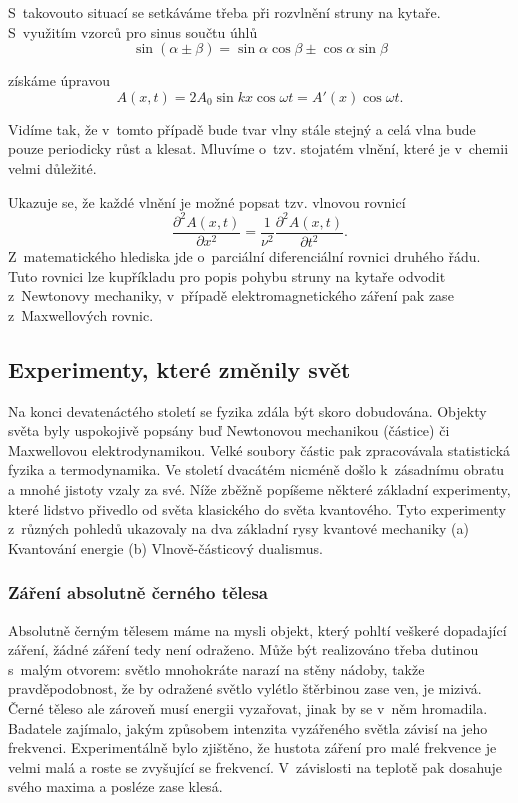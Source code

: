 \noindent S~takovouto situací se setkáváme třeba při rozvlnění struny na kytaře. S~využitím vzorců pro sinus součtu úhlů
\begin{equation}
\sin(\alpha \pm \beta) = \sin \alpha\cos\beta \pm \cos\alpha\sin\beta
\label{rov:Vlna7}
\end{equation}

\noindent získáme úpravou
\begin{equation}
A(x,t)=2A_0\sin kx \cos \omega t = A'(x)\cos \omega t.
\label{rov:Vlna8}
\end{equation}

\noindent Vidíme tak, že v~tomto případě bude tvar vlny stále stejný a celá vlna bude pouze periodicky růst a klesat. Mluvíme o~tzv. stojatém vlnění, které je v~chemii velmi důležité.

Ukazuje se, že každé vlnění je možné popsat tzv. vlnovou rovnicí
\begin{equation}
\frac{\partial ^2A(x,t)}{\partial x^2} = \frac{1}{\nu^2}\frac{\partial^2A(x,t)}{\partial t^2}\mbox{.}
\label{rov:Vlna9}
\end{equation}
Z~matematického hlediska jde o~parciální diferenciální rovnici druhého řádu. Tuto rovnici lze kupříkladu pro popis pohybu struny na kytaře odvodit z~Newtonovy mechaniky, v~případě elektromagnetického záření pak zase z~Maxwellových rovnic. 

\subsection{Experimenty, které změnily svět}

Na konci devatenáctého století se fyzika zdála být skoro dobudována. Objekty světa byly uspokojivě popsány buď Newtonovou mechanikou (částice) či Maxwellovou elektrodynamikou. Velké soubory částic pak zpracovávala statistická fyzika a termodynamika. Ve století dvacátém nicméně došlo k~zásadnímu obratu a mnohé jistoty vzaly za své. Níže zběžně popíšeme některé základní experimenty, které lidstvo přivedlo od světa klasického do světa kvantového. Tyto experimenty z~různých pohledů ukazovaly na dva základní rysy kvantové mechaniky (a) Kvantování energie (b) Vlnově-částicový dualismus.

\subsubsection{Záření absolutně černého tělesa}

Absolutně černým tělesem máme na mysli objekt, který pohltí veškeré dopadající záření, žádné záření tedy není odraženo. Může být realizováno třeba dutinou s~malým otvorem: světlo mnohokráte narazí na stěny nádoby, takže pravděpodobnost, že by odražené světlo vylétlo štěrbinou zase ven, je mizivá. Černé těleso ale zároveň musí energii vyzařovat, jinak by se v~něm hromadila. Badatele zajímalo, jakým způsobem intenzita vyzářeného světla závisí na jeho frekvenci. Experimentálně bylo zjištěno, že hustota záření pro malé frekvence je velmi malá a roste se zvyšující se frekvencí. V~závislosti na teplotě pak dosahuje svého maxima a posléze zase klesá. 

